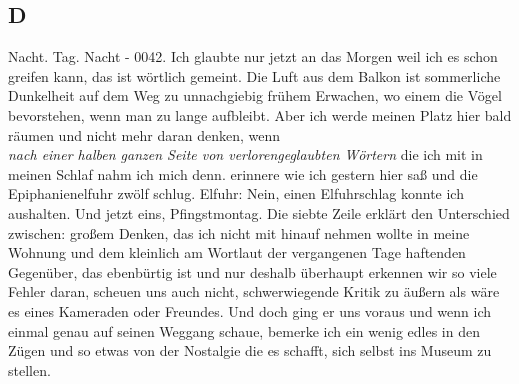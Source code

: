 \documentclass[
]{article}
\author{}
\date{\vspace{-2.5em}}
\begin{document}
\subsection{D}\label{d}

Nacht. Tag. Nacht - 0042. Ich glaubte nur jetzt an das Morgen weil ich
es schon greifen kann, das ist wörtlich gemeint. Die Luft aus dem Balkon
ist sommerliche Dunkelheit auf dem Weg zu unnachgiebig frühem Erwachen,
wo einem die Vögel bevorstehen, wenn man zu lange aufbleibt. Aber ich
werde meinen Platz hier bald räumen und nicht mehr daran denken, wenn\\
\emph{nach einer halben ganzen Seite von verlorengeglaubten Wörtern} die
ich mit in meinen Schlaf nahm ich mich denn. erinnere wie ich gestern
hier saß und die Epiphanienelfuhr zwölf schlug. Elfuhr: Nein, einen
Elfuhrschlag konnte ich aushalten. Und jetzt eins, Pfingstmontag. Die
siebte Zeile erklärt den Unterschied zwischen: großem Denken, das ich
nicht mit hinauf nehmen wollte in meine Wohnung und dem kleinlich am
Wortlaut der vergangenen Tage haftenden Gegenüber, das ebenbürtig ist
und nur deshalb überhaupt erkennen wir so viele Fehler daran, scheuen
uns auch nicht, schwerwiegende Kritik zu äußern als wäre es eines
Kameraden oder Freundes. Und doch ging er uns voraus und wenn ich einmal
genau auf seinen Weggang schaue, bemerke ich ein wenig edles in den
Zügen und so etwas von der Nostalgie die es schafft, sich selbst ins
Museum zu stellen.
\end{document}
